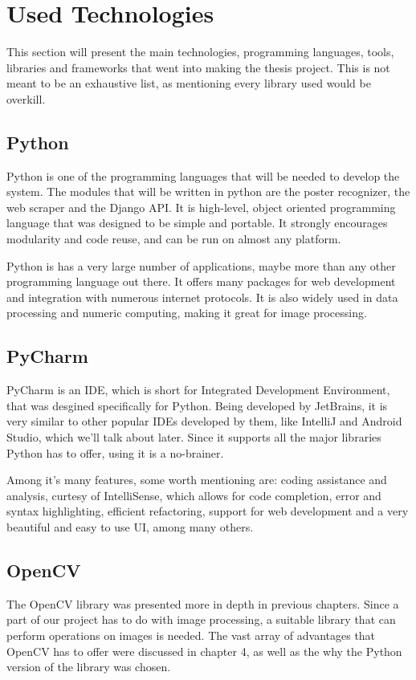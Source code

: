 \documentclass[12pt,a4paper,twoside]{report}
\begin{document}
\section{Used Technologies}
This section will present the main technologies, programming languages, tools, libraries and frameworks that went into making the thesis project. This is not meant to be an exhaustive list, as mentioning every library used would be overkill.

\subsection{Python}
Python is one of the programming languages that will be needed to develop the system. The modules that will be written in python are the poster recognizer, the web scraper and the Django API. It is high-level, object oriented programming language that was designed to be simple and portable. It strongly encourages modularity and code reuse, and can be run on almost any platform. 

Python is has a very large number of applications, maybe more than any other programming language out there. It offers many packages for web development and integration with numerous internet protocols. It is also widely used in data processing and numeric computing, making it great for image processing.

\subsection{PyCharm}
PyCharm is an IDE, which is short for Integrated Development Environment, that was desgined specifically for Python. Being developed by JetBrains, it is very similar to other popular IDEs developed by them, like IntelliJ and Android Studio, which we'll talk about later. Since it supports all the major libraries Python has to offer, using it is a no-brainer. 

Among it's many features, some worth mentioning are: coding assistance and analysis, curtesy of IntelliSense, which allows for code completion, error and syntax highlighting, efficient refactoring, support for web development and a very beautiful and easy to use UI, among many others.

\subsection{OpenCV}
The OpenCV library was presented more in depth in previous chapters. Since a part of our project has to do with image processing, a suitable library that can perform operations on images is needed. The vast array of advantages that OpenCV has to offer were discussed in chapter 4, as well as the why the Python version of the library was chosen.
\end{document}
